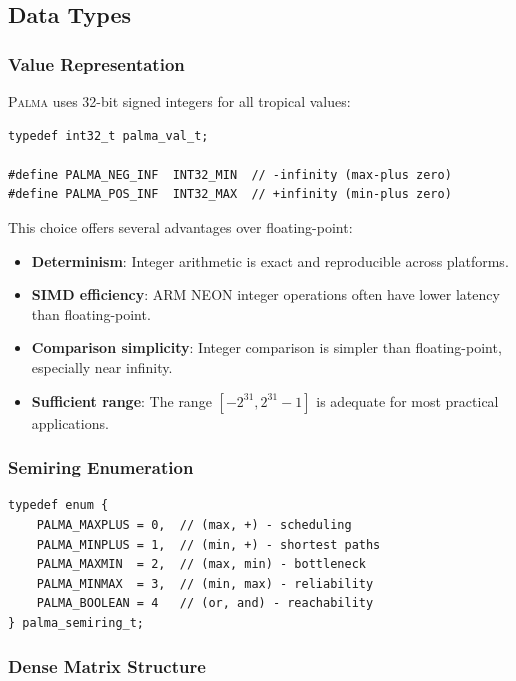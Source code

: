 \documentclass[11pt,a4paper]{article}
\theoremstyle{plain}
\theoremstyle{definition}
\newcommand{\palma}{\textsc{Palma}}
\begin{document}
\subsection{Data Types}

\subsubsection{Value Representation}

\palma{} uses 32-bit signed integers for all tropical values:

\begin{lstlisting}[caption={Value type definition}]
typedef int32_t palma_val_t;

#define PALMA_NEG_INF  INT32_MIN  // -infinity (max-plus zero)
#define PALMA_POS_INF  INT32_MAX  // +infinity (min-plus zero)
\end{lstlisting}

This choice offers several advantages over floating-point:
\begin{itemize}
    \item \textbf{Determinism}: Integer arithmetic is exact and reproducible across platforms.
    \item \textbf{SIMD efficiency}: ARM NEON integer operations often have lower latency than floating-point.
    \item \textbf{Comparison simplicity}: Integer comparison is simpler than floating-point, especially near infinity.
    \item \textbf{Sufficient range}: The range $[-2^{31}, 2^{31}-1]$ is adequate for most practical applications.
\end{itemize}

\subsubsection{Semiring Enumeration}

\begin{lstlisting}[caption={Semiring type enumeration}]
typedef enum {
    PALMA_MAXPLUS = 0,  // (max, +) - scheduling
    PALMA_MINPLUS = 1,  // (min, +) - shortest paths
    PALMA_MAXMIN  = 2,  // (max, min) - bottleneck
    PALMA_MINMAX  = 3,  // (min, max) - reliability
    PALMA_BOOLEAN = 4   // (or, and) - reachability
} palma_semiring_t;
\end{lstlisting}

\subsubsection{Dense Matrix Structure}
\end{document}
